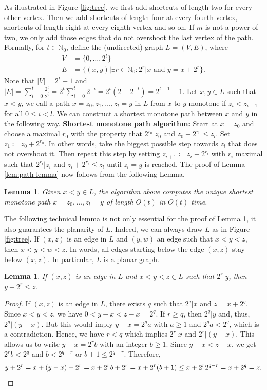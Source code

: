 \documentclass[11pt]{article}
\newtheorem{lemma}[theorem]{Lemma}
\begin{document}
As illustrated in Figure \ref{fig:tree}, we first add shortcuts of length two for every other vertex. Then we add shortcuts of length four at every fourth vertex, shortcuts of length eight at every eighth vertex and so on. If $m$ is not a power of two, we only add those edges that do not overshoot the last vertex of the path. Formally, for $t\in \mathbb{N}_0$, define the (undirected) graph $L=(V,E)$, where
\begin{equation*}
\begin{aligned}
V&=\{0,\ldots,2^t\} \\ 
E&=\{(x,y)\vert\exists r\in\mathbb{N}_0\colon 2^r\vert x\text{ and } y=x+2^r\}.
\end{aligned}
\end{equation*}
Note that $\vert V\vert=2^t+1$ and $\vert E\vert=\sum_{i=0}^t \frac{2^t}{2^i}=2^t \sum_{i=0}^t 2^{-i}=2^t(2-2^{-t})=2^{t+1}-1$.
%
Let $x,y\in L$ such that $x<y$, we call a path $x=z_0,z_1,\ldots,z_l=y$ in $L$ from $x$ to $y$ monotone if $z_i<z_{i+1}$ for all $0\leq i<l$. We can construct a shortest monotone path between $x$ and $y$ in the following way.
%
\textbf{Shortest monotone path algorithm:} Start at $x=z_0$ and choose a maximal $r_0$ with the property that $2^{r_0}\vert z_0$ and $z_0+2^{r_0}\leq z_l$. Set $z_1\coloneqq z_0+2^{r_0}$. In other words, take the biggest possible step towards $z_l$ that does not overshoot it. Then repeat this step by setting $z_{i+1}\coloneqq z_i+2^{r_i}$ with $r_i$ maximal such that $2^{r_i}\vert z_i$ and $z_i+2^{r_i}\leq z_l$ until $z_l=y$ is reached. 
%
The proof of Lemma \ref{lem:path-lemma} now follows from the following Lemma.
%
\begin{lemma} \label{prop:shortest_path}
Given $x<y\in L$, the algorithm above computes the unique shortest monotone path $x=z_0,\ldots,z_l=y$ of length $O(t)$ in $O(t)$ time.
\end{lemma}
%
The following technical lemma is not only essential for the proof of Lemma \ref{prop:shortest_path}, it also guarantees the planarity of $L$. 
Indeed, we can always draw $L$ as in Figure \ref{fig:tree}. If $(x,z)$ is an edge in $L$ and $(y,w)$ an edge such that $x<y<z$, then $x<y<w<z$. In words, all edges starting below the edge $(x,z)$ stay below $(x,z)$. In particular, $L$ is a planar graph.
%
\begin{lemma} \label{prop:crossing}
If $(x,z)$ is an edge in $L$ and $x<y<z\in L$ such that $2^r\vert y$, then $y+2^r\leq z$.  
\end{lemma}
%
\begin{proof}
If $(x,z)$ is an edge in $L$, there exists $q$ such that $2^q\vert x$ and $z=x+2^q$. Since $x<y<z$, we have $0<y-x<z-x=2^q$. If $r\geq q$, then $2^q\vert y$ and, thus, $2^q\vert(y-x)$. But this would imply $y-x=2^qa$ with $a\geq 1$ and $2^qa<2^q$, which is a contradiction. Hence, we have $r<q$ which implies $2^r\vert x$ and $2^r\vert(y-x)$. This allows us to write $y-x=2^rb$ with an integer $b\geq 1$. Since $y-x<z-x$, we get $2^rb<2^q$ and $b<2^{q-r}$ or $b+1\leq 2^{q-r}$. Therefore,
\begin{equation*}
y+2^r=x+(y-x)+2^r=x+2^rb+2^r=x+2^r(b+1)\leq x+2^r2^{q-r}=x+2^q=z.\qedhere
\end{equation*}
\end{proof}
\end{document}

